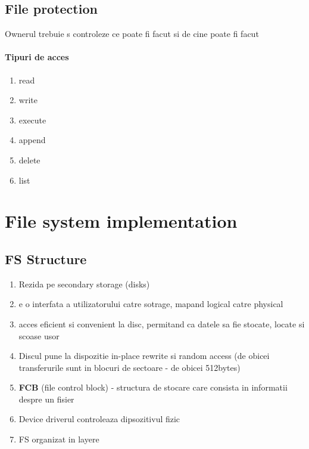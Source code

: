 \documentclass{article}
\begin{document}
\subsection*{File protection}
Ownerul trebuie s controleze ce poate fi facut si de cine poate fi facut
\paragraph*{Tipuri de acces}
\begin{enumerate}
    \item read
    \item write
    \item execute
    \item append
    \item delete
    \item list
\end{enumerate}


\section[Ch14 File system implementation]{File system implementation}
\subsection*{FS Structure}
\begin{enumerate}
    \item Rezida pe secondary storage (disks)
    \item e o interfata a utilizatorului catre sotrage, mapand logical catre physical
    \item acces eficient si convenient la disc, permitand ca datele sa fie stocate, locate si scoase usor
    \item Discul pune la dispozitie in-place rewrite si random access (de obicei transferurile sunt in blocuri de sectoare - de obicei 512bytes)
    \item \textbf{FCB} (file control block) - structura de stocare care consista in informatii despre un fisier
    \item Device driverul controleaza dipsozitivul fizic
    \item FS organizat in layere
\end{enumerate}
\end{document}
